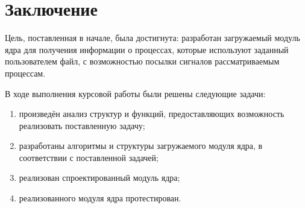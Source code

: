 \chapter*{Заключение}

Цель, поставленная в начале, была достигнута: разработан загружаемый модуль ядра для получения информации о процессах, которые используют заданный пользователем файл, с возможностью посылки сигналов рассматриваемым процессам.

В ходе выполнения курсовой работы были решены следующие задачи:
\begin{enumerate}[label=\arabic*)]
	\item произведён анализ структур и функций, предоставляющих возможность реализовать поставленную задачу;
	\item разработаны алгоритмы и структуры загружаемого модуля ядра, в соответствии с поставленной задачей;
	\item реализован спроектированный модуль ядра;
	\item реализованного модуля ядра протестирован.
\end{enumerate}
